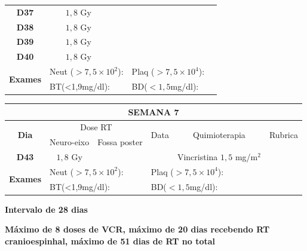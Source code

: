 \documentclass[11pt,a4paper,oldfontcommands]{memoir}
\begin{document}
\begin{center}
\begin{table}[H]
\begin{tabular}{p{1cm}p{2cm}|p{2cm}|p{1cm}|p{4cm}|p{3cm}}
    \multicolumn{1}{c|}{\multirow{1}{*}{\textbf{D37}}}&\multicolumn{1}{c|}{\(1,8\) Gy}&&&{}&\\
    \multicolumn{1}{c|}{\multirow{1}{*}{\textbf{D38}}}&\multicolumn{1}{c|}{\(1,8\) Gy}&&&{}&\\
    \multicolumn{1}{c|}{\multirow{1}{*}{\textbf{D39}}}&\multicolumn{1}{c|}{\(1,8\) Gy}&&&{}&\\
    \multicolumn{1}{c|}{\multirow{1}{*}{\textbf{D40}}}&\multicolumn{1}{c|}{\(1,8\) Gy}&&&{}&\\
    \hline
    \multicolumn{1}{c|}{\multirow{2}{*}{\textbf{Exames}}}&\multicolumn{2}{l|}{Neut (\(>7,5\times10^2\)):}&\multicolumn{2}{l|}{Plaq (\(>7,5\times10^4\)):}&\\
    \cline{2-6}
    \multicolumn{1}{c|}{\multirow{2}{*}{{}}}&\multicolumn{2}{l|}{BT(<1,9mg/dl):}&\multicolumn{2}{l|}{BD(\(<1,5\)mg/dl):}&
    \\
    \hline
\end{tabular}
\end{table}
\begin{table}[H]
\begin{tabular}{p{1cm}p{2cm}|p{2cm}|p{1cm}|p{4cm}|p{3cm}}
	\hline
	\multicolumn{6}{c}{\textbf{SEMANA 7}}\\
\hline
    \multicolumn{1}{c|}{\multirow{2}{*}{\textbf{Dia}}}&\multicolumn{2}{c|}{Dose RT}&\multicolumn{1}{c|}{\multirow{2}{*}{Data}}&\multicolumn{1}{c|}{\multirow{2}{*}{Quimioterapia}}&\multicolumn{1}{c}{\multirow{2}{*}{Rubrica}} \\
    \cline{2-3}
    \multicolumn{1}{c|}{\multirow{1}{*}{}}&{Neuro-eixo}&{Fossa poster}&& \\
	\hline
	\multicolumn{1}{c|}{\multirow{1}{*}{\textbf{D43}}}&\multicolumn{1}{c|}{\(1,8\) Gy}&&&{Vincristina \(1,5\) mg/m\(^2\)}&\\
    \hline
    \multicolumn{1}{c|}{\multirow{2}{*}{\textbf{Exames}}}&\multicolumn{2}{l|}{Neut (\(>7,5\times10^2\)):}&\multicolumn{2}{l|}{Plaq (\(>7,5\times10^4\)):}&\\
    \cline{2-6}
    \multicolumn{1}{c|}{\multirow{2}{*}{{}}}&\multicolumn{2}{l|}{BT(<1,9mg/dl):}&\multicolumn{2}{l|}{BD(\(<1,5\)mg/dl):}&
    \\
    \hline
\end{tabular}
\end{table}
\textbf{Intervalo de 28 dias}\\
\end{center}
\textbf{Máximo de 8 doses de VCR, máximo de 20 dias recebendo RT cranioespinhal, máximo de 51 dias de RT no total}
\end{document}
